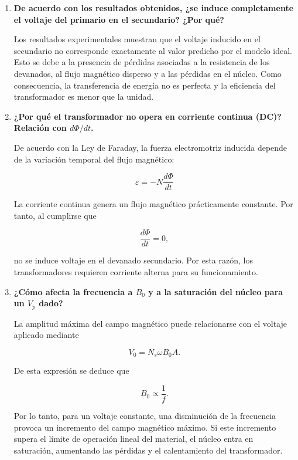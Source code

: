 \begin{enumerate}
\item \textbf{De acuerdo con los resultados obtenidos, ¿se induce completamente el voltaje del primario en el secundario? ¿Por qué?}

Los resultados experimentales muestran que el voltaje inducido en el secundario no corresponde exactamente al valor predicho por el modelo ideal. Esto se debe a la presencia de pérdidas asociadas a la resistencia de los devanados, al flujo magnético disperso y a las pérdidas en el núcleo. Como consecuencia, la transferencia de energía no es perfecta y la eficiencia del transformador es menor que la unidad.

\item \textbf{¿Por qué el transformador no opera en corriente continua (DC)? Relación con $d\Phi/dt$.}

De acuerdo con la Ley de Faraday, la fuerza electromotriz inducida depende de la variación temporal del flujo magnético:

\begin{equation}
\varepsilon = -N\frac{d\Phi}{dt}
\end{equation}

La corriente continua genera un flujo magnético prácticamente constante. Por tanto, al cumplirse que

\begin{equation}
\frac{d\Phi}{dt}=0,
\end{equation}

no se induce voltaje en el devanado secundario. Por esta razón, los transformadores requieren corriente alterna para su funcionamiento.

\item \textbf{¿Cómo afecta la frecuencia a $B_0$ y a la saturación del núcleo para un $V_p$ dado?}

La amplitud máxima del campo magnético puede relacionarse con el voltaje aplicado mediante

\begin{equation}
V_0=N_s\omega B_0A.
\end{equation}

De esta expresión se deduce que

\begin{equation}
B_0\propto \frac{1}{f}.
\end{equation}

Por lo tanto, para un voltaje constante, una disminución de la frecuencia provoca un incremento del campo magnético máximo. Si este incremento supera el límite de operación lineal del material, el núcleo entra en saturación, aumentando las pérdidas y el calentamiento del transformador.


\end{enumerate}
